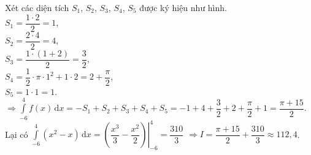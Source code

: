 \begin{ex}
{\begin{center}
\end{center}
Xét các diện tích $S_1$, $S_2$, $S_3$, $S_4$, $S_5$ được ký hiệu như hình.\\
$S_1=\dfrac{1\cdot 2}{2}=1$,\\
$S_2=\dfrac{2\cdot 4}{2}=4$,\\
$S_3=\dfrac{1\cdot(1+2)}{2}=\dfrac{3}{2}$,\\
$S_4=\dfrac{1}{2} \cdot \pi \cdot 1^2+1\cdot 2=2+\dfrac{\pi}{2}$,\\
$S_5=1\cdot 1=1$.\\
$\Rightarrow \displaystyle\int\limits_{-6}^4f(x) \mathrm{\,d}x=-S_1+S_2+S_3+S_4+S_5=-1+4+\dfrac{3}{2}+2+\dfrac{\pi}{2}+1=\dfrac{\pi+15}{2}$.\\
Lại có $\displaystyle\int\limits_{-6}^4\left(x^2-x\right) \mathrm{\,d}x=\left.\left(\dfrac{x^3}{3}-\dfrac{x^2}{2}\right)\right|_{-6} ^4=\dfrac{310}{3}$
$\Rightarrow I=\dfrac{\pi+15}{2}+\dfrac{310}{3} \approx 112{,}4$.
}
\end{ex}

